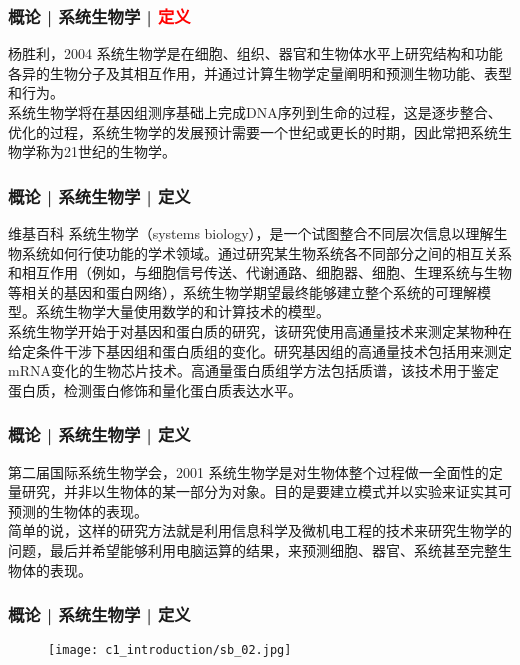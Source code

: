 \begin{frame}
  \frametitle{概论 | 系统生物学 | \textcolor{red}{定义}}
  \begin{block}{杨胜利，2004}
系统生物学是在细胞、组织、器官和生物体水平上研究结构和功能各异的生物分子及其相互作用，并通过计算生物学定量阐明和预测生物功能、表型和行为。\\
\vspace{1em}
系统生物学将在基因组测序基础上完成DNA序列到生命的过程，这是逐步整合、优化的过程，系统生物学的发展预计需要一个世纪或更长的时期，因此常把系统生物学称为21世纪的生物学。
  \end{block}
\end{frame}

\begin{frame}
  \frametitle{概论 | 系统生物学 | 定义}
  \begin{block}{维基百科}
系统生物学（systems biology），是一个试图整合不同层次信息以理解生物系统如何行使功能的学术领域。通过研究某生物系统各不同部分之间的相互关系和相互作用（例如，与细胞信号传送、代谢通路、细胞器、细胞、生理系统与生物等相关的基因和蛋白网络），系统生物学期望最终能够建立整个系统的可理解模型。系统生物学大量使用数学的和计算技术的模型。\\
\vspace{1em}
系统生物学开始于对基因和蛋白质的研究，该研究使用高通量技术来测定某物种在给定条件干涉下基因组和蛋白质组的变化。研究基因组的高通量技术包括用来测定mRNA变化的生物芯片技术。高通量蛋白质组学方法包括质谱，该技术用于鉴定蛋白质，检测蛋白修饰和量化蛋白质表达水平。
  \end{block}
\end{frame}

\begin{frame}
  \frametitle{概论 | 系统生物学 | 定义}
  \begin{block}{第二届国际系统生物学会，2001}
系统生物学是对生物体整个过程做一全面性的定量研究，并非以生物体的某一部分为对象。目的是要建立模式并以实验来证实其可预测的生物体的表现。\\
\vspace{1em}
简单的说，这样的研究方法就是利用信息科学及微机电工程的技术来研究生物学的问题，最后并希望能够利用电脑运算的结果，来预测细胞、器官、系统甚至完整生物体的表现。
  \end{block}
\end{frame}

\begin{frame}
  \frametitle{概论 | 系统生物学 | 定义}
  \begin{figure}
    \centering
    \texttt{[image: c1\_introduction/sb\_02.jpg]}
  \end{figure}
\end{frame}

